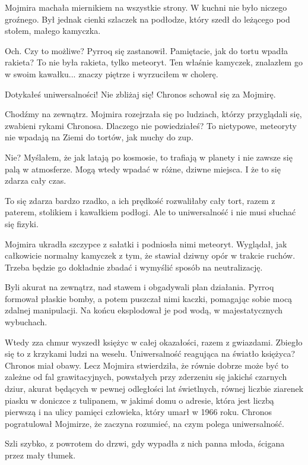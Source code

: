Mojmira machała miernikiem na wszystkie strony. W kuchni nie było niczego groźnego. Był jednak cienki szlaczek na podłodze, który szedł do leżącego pod stołem, małego kamyczka.

\ds{} Och. Czy to możliwe? \dm{} Pyrroq się zastanowił. \dm{} Pamiętacie, jak do tortu wpadła rakieta? To nie była rakieta, tylko meteoryt. 
Ten właśnie kamyczek, znalazłem go w swoim kawałku... znaczy piętrze i wyrzuciłem w cholerę. \de{}

\ds{} Dotykałeś uniwersalności! Nie zbliżaj się! \dm{} Chronos schował się za Mojmirę. \de{}

\ds{} Chodźmy na zewnątrz. \dm{} Mojmira rozejrzała się po ludziach, którzy przyglądali się, zwabieni rykami Chronosa. \dm{} 
Dlaczego nie powiedziałeś? To nietypowe, meteoryty nie wpadają na Ziemi do tortów, jak muchy do zup. \de{}

\ds{} Nie? Myślałem, że jak latają po kosmosie, to trafiają w planety i nie zawsze się palą w atmosferze. Mogą wtedy wpadać w różne, dziwne miejsca. 
I że to się zdarza cały czas. \de{}

\ds{} To się zdarza bardzo rzadko, a ich prędkość rozwaliłaby cały tort, razem z paterem, stolikiem i kawałkiem podłogi. Ale to uniwersalność i nie musi słuchać się fizyki. 

Mojmira ukradła szczypce z sałatki i podniosła nimi meteoryt.
Wyglądał, jak całkowicie normalny kamyczek z tym, że stawiał dziwny opór w trakcie ruchów.
Trzeba będzie go dokładnie zbadać i wymyślić sposób na neutralizację.

\divider{}

Byli akurat na zewnątrz, nad stawem i obgadywali plan działania. 
Pyrroq formował płaskie bomby, a potem puszczał nimi kaczki, pomagając sobie mocą zdalnej manipulacji.
Na końcu eksplodował je pod wodą, w majestatycznych wybuchach.

Wtedy zza chmur wyszedł księżyc w całej okazałości, razem z gwiazdami.
Zbiegło się to z krzykami ludzi na weselu. 
Uniwersalność reagująca na światło księżyca? Chronos miał obawy.
Lecz Mojmira stwierdziła, że równie dobrze może być to zależne od fal grawitacyjnych, powstałych przy zderzeniu się jakichś czarnych dziur, akurat będących 
w pewnej odległości lat świetlnych, równej liczbie ziarenek piasku w doniczce z 
tulipanem, w jakimś domu o adresie, która jest liczbą pierwszą i na ulicy pamięci człowieka, który umarł w 1966 roku.
Chronos pogratulował Mojmirze, że zaczyna rozumieć, na czym polega uniwersalność.

Szli szybko, z powrotem do drzwi, gdy wypadła z nich panna młoda, ścigana przez mały tłumek.


